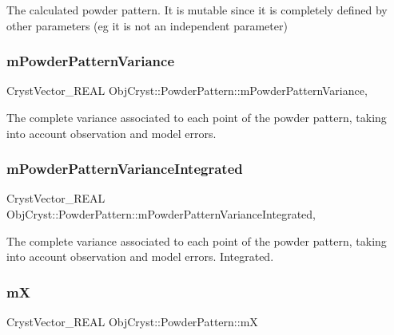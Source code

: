 The calculated powder pattern. It is mutable since it is completely defined by other parameters (eg it is not an \textquotesingle{}independent parameter\textquotesingle{}) \mbox{\label{class_obj_cryst_1_1_powder_pattern_ac962c591539d06c65ce32e56580029c2}} 
\subsubsection{\texorpdfstring{mPowderPatternVariance}{mPowderPatternVariance}}
{\footnotesize\ttfamily Cryst\+Vector\+\_\+\+R\+E\+AL Obj\+Cryst\+::\+Powder\+Pattern\+::m\+Powder\+Pattern\+Variance\hspace{0.3cm}{\ttfamily [mutable]}, {\ttfamily [protected]}}

The complete variance associated to each point of the powder pattern, taking into account observation and model errors. \mbox{\label{class_obj_cryst_1_1_powder_pattern_a7c7192cf095beca2d515a15f4c57d227}} 
\subsubsection{\texorpdfstring{mPowderPatternVarianceIntegrated}{mPowderPatternVarianceIntegrated}}
{\footnotesize\ttfamily Cryst\+Vector\+\_\+\+R\+E\+AL Obj\+Cryst\+::\+Powder\+Pattern\+::m\+Powder\+Pattern\+Variance\+Integrated\hspace{0.3cm}{\ttfamily [mutable]}, {\ttfamily [protected]}}

The complete variance associated to each point of the powder pattern, taking into account observation and model errors. Integrated. \mbox{\label{class_obj_cryst_1_1_powder_pattern_ac71a81d157387c2bdb7791cfa6d18e64}} 
\subsubsection{\texorpdfstring{mX}{mX}}
{\footnotesize\ttfamily Cryst\+Vector\+\_\+\+R\+E\+AL Obj\+Cryst\+::\+Powder\+Pattern\+::mX\hspace{0.3cm}{\ttfamily [protected]}}

